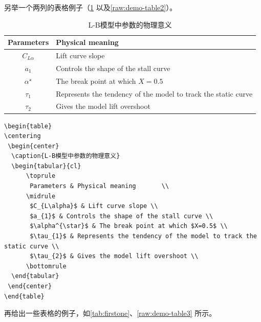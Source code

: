 另举一个两列的表格例子（\cref{tab:LB-parameters} 以及\cref{raw:demo-table2}）。

\begin{table}              %
\centering
 \begin{center}
  \caption{L-B模型中参数的物理意义}
  \label{tab:LB-parameters}
  \begin{tabular}{cl}
      \toprule
       Parameters & Physical meaning       \\
      \midrule
       $C_{L\alpha}$ & Lift curve slope \\
       $a_{1}$ & Controls the shape of the stall curve \\
       $\alpha^{\star}$ & The break point at which $X=0.5$ \\
       $\tau_{1}$ & Represents the tendency of the model to track the static curve \\
       $\tau_{2}$ & Gives the model lift overshoot \\
      \bottomrule
  \end{tabular}
 \end{center}
\end{table}

\begin{lstlisting}[language={[LaTeX]TeX}, caption={插入\cref{tab:LB-parameters}}, label=raw:demo-table2]
\begin{table}
\centering
 \begin{center}
  \caption{L-B模型中参数的物理意义}
  \begin{tabular}{cl}
      \toprule
       Parameters & Physical meaning       \\
      \midrule
       $C_{L\alpha}$ & Lift curve slope \\
       $a_{1}$ & Controls the shape of the stall curve \\
       $\alpha^{\star}$ & The break point at which $X=0.5$ \\
       $\tau_{1}$ & Represents the tendency of the model to track the static curve \\
       $\tau_{2}$ & Gives the model lift overshoot \\
      \bottomrule
  \end{tabular}
 \end{center}
\end{table}
\end{lstlisting}

再给出一些表格的例子，如\cref{tab:firstone}、\cref{raw:demo-table3} 所示。

